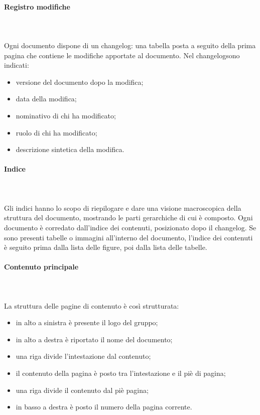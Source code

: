 		\paragraph{Registro modifiche} \mbox{}\\ \mbox{}\\
		Ogni documento dispone di un changelog\glo: una tabella posta a seguito della prima pagina che contiene le modifiche apportate al documento. Nel changelog\glo sono indicati:
		\begin{itemize}
			\item versione del documento dopo la modifica;
			\item data della modifica;
			\item nominativo di chi ha modificato;
			\item ruolo di chi ha modificato;
			\item descrizione sintetica della modifica.
		\end{itemize}
		\paragraph{Indice} \mbox{}\\ \mbox{}\\
		Gli indici hanno lo scopo di riepilogare e dare una visione macroscopica della struttura del documento, mostrando le parti gerarchiche di cui è composto.\newline 
		Ogni documento è corredato dall'indice dei contenuti, posizionato dopo il changelog\glo. Se sono presenti tabelle o immagini all'interno del documento, l'indice dei contenuti è seguito prima dalla lista delle figure, poi dalla lista delle tabelle.
		\paragraph{Contenuto principale} \mbox{}\\ \mbox{}\\
		La struttura delle pagine di contenuto è così strutturata:
		\begin{itemize}
			\item in alto a sinistra è presente il logo del gruppo;
			\item in alto a destra è riportato il nome del documento;
			\item una riga divide l'intestazione dal contenuto;
			\item il contenuto della pagina è posto tra l'intestazione e il piè di pagina;
			\item una riga divide il contenuto dal piè pagina;
			\item in basso a destra è posto il numero della pagina corrente.
		\end{itemize}
